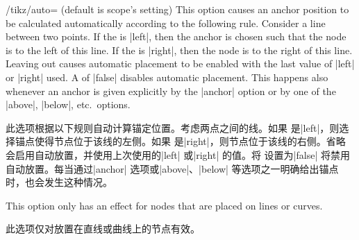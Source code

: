 \begin{key}{/tikz/auto= (default \normalfont is scope's setting)}
    This option causes an anchor position to be calculated automatically
    according to the following rule. Consider a line between two points. If the
     is |left|, then the anchor is chosen such that the node is
    to the left of this line. If the  is |right|, then the node
    is to the right of this line. Leaving out  causes automatic
    placement to be enabled with the last value of |left| or |right| used. A
     of |false| disables automatic placement. This happens also
    whenever an anchor is given explicitly by the |anchor| option or by one of
    the |above|, |below|, etc.\ options.

    此选项根据以下规则自动计算锚定位置。考虑两点之间的线。如果 是|left|，则选择锚点使得节点位于该线的左侧。如果 是|right|，则节点位于该线的右侧。省略 会启用自动放置，并使用上次使用的|left| 或|right| 的值。将 设置为|false| 将禁用自动放置。每当通过|anchor| 选项或|above|、|below| 等选项之一明确给出锚点时，也会发生这种情况。



    This option only has an effect for nodes that are placed on lines or
    curves.
    
    此选项仅对放置在直线或曲线上的节点有效。

\begin{codeexample}[]
\end{codeexample}
\end{key}

